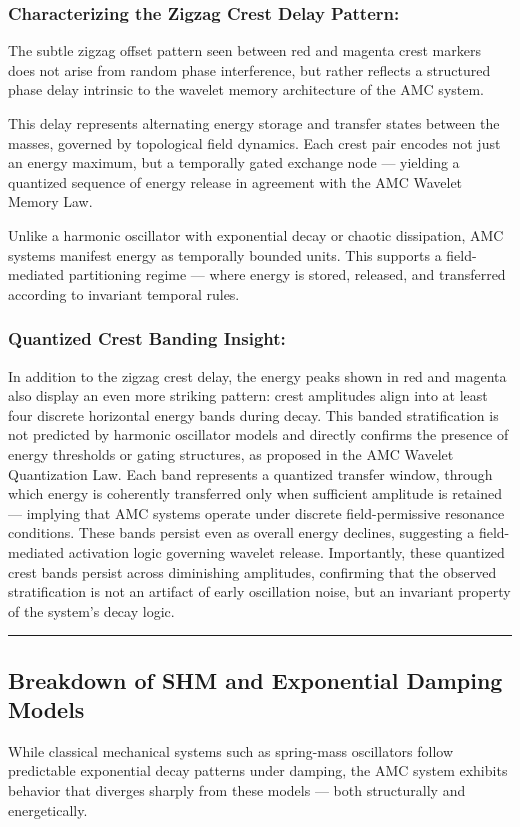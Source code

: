 \documentclass[10pt,aps,pre,onecolumn,superscriptaddress,notitlepage]{revtex4-2}
\begin{document}
\subsubsection{Characterizing the Zigzag Crest Delay Pattern:}
The subtle zigzag offset pattern seen between red and magenta crest markers does not arise from random phase interference, but rather reflects a structured phase delay intrinsic to the wavelet memory architecture of the AMC system.

This delay represents alternating energy storage and transfer states between the masses, governed by topological field dynamics. Each crest pair encodes not just an energy maximum, but a temporally gated exchange node — yielding a quantized sequence of energy release in agreement with the AMC Wavelet Memory Law.


Unlike a harmonic oscillator with exponential decay or chaotic dissipation, AMC systems manifest energy as temporally bounded units. This supports a field-mediated partitioning regime — where energy is stored, released, and transferred according to invariant temporal rules.

\subsubsection{Quantized Crest Banding Insight:}
In addition to the zigzag crest delay, the energy peaks shown in red and magenta also display an even more striking pattern: crest amplitudes align into at least four discrete horizontal energy bands during decay. This banded stratification is not predicted by harmonic oscillator models and directly confirms the presence of energy thresholds or gating structures, as proposed in the AMC Wavelet Quantization Law. Each band represents a quantized transfer window, through which energy is coherently transferred only when sufficient amplitude is retained — implying that AMC systems operate under discrete field-permissive resonance conditions. These bands persist even as overall energy declines, suggesting a field-mediated activation logic governing wavelet release. Importantly, these quantized crest bands persist across diminishing amplitudes, confirming that the observed stratification is not an artifact of early oscillation noise, but an invariant property of the system’s decay logic.
\vspace{1em}
\hrule
\vspace{0.2em}

\subsection{Breakdown of SHM and Exponential Damping Models}
\label{sec:BreakdownofSHM}
While classical mechanical systems such as spring-mass oscillators follow predictable exponential decay patterns under damping, the AMC system exhibits behavior that diverges sharply from these models — both structurally and energetically.
\end{document}
